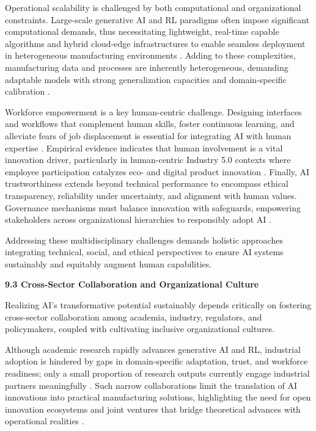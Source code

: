 \documentclass[11pt]{article}
\begin{document}
Operational scalability is challenged by both computational and organizational constraints. Large-scale generative AI and RL paradigms often impose significant computational demands, thus necessitating lightweight, real-time capable algorithms and hybrid cloud-edge infrastructures to enable seamless deployment in heterogeneous manufacturing environments \cite{ref19,ref37}. Adding to these complexities, manufacturing data and processes are inherently heterogeneous, demanding adaptable models with strong generalization capacities and domain-specific calibration \cite{ref7,ref29}.

Workforce empowerment is a key human-centric challenge. Designing interfaces and workflows that complement human skills, foster continuous learning, and alleviate fears of job displacement is essential for integrating AI with human expertise \cite{ref2,ref22}. Empirical evidence indicates that human involvement is a vital innovation driver, particularly in human-centric Industry 5.0 contexts where employee participation catalyzes eco- and digital product innovation \cite{ref22}. Finally, AI trustworthiness extends beyond technical performance to encompass ethical transparency, reliability under uncertainty, and alignment with human values. Governance mechanisms must balance innovation with safeguards, empowering stakeholders across organizational hierarchies to responsibly adopt AI \cite{ref41}.

Addressing these multidisciplinary challenges demands holistic approaches integrating technical, social, and ethical perspectives to ensure AI systems sustainably and equitably augment human capabilities.

\textbf{9.3 Cross-Sector Collaboration and Organizational Culture}

Realizing AI’s transformative potential sustainably depends critically on fostering cross-sector collaboration among academia, industry, regulators, and policymakers, coupled with cultivating inclusive organizational cultures.

Although academic research rapidly advances generative AI and RL, industrial adoption is hindered by gaps in domain-specific adaptation, trust, and workforce readiness; only a small proportion of research outputs currently engage industrial partners meaningfully \cite{ref7}. Such narrow collaborations limit the translation of AI innovations into practical manufacturing solutions, highlighting the need for open innovation ecosystems and joint ventures that bridge theoretical advances with operational realities \cite{ref3}.
\end{document}
